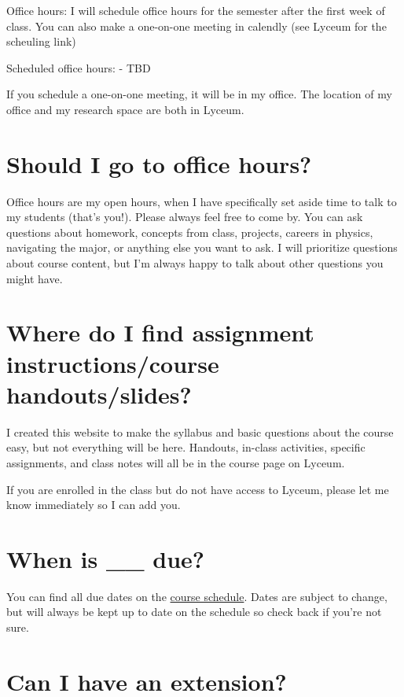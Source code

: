 \documentclass[
  letterpaper,
  DIV=11,
  numbers=noendperiod]{scrartcl}
\begin{document}
Office hours: I will schedule office hours for the semester after the
first week of class. You can also make a one-on-one meeting in calendly
(see Lyceum for the scheuling link)

Scheduled office hours: - TBD

If you schedule a one-on-one meeting, it will be in my office. The
location of my office and my research space are both in Lyceum.

\section{Should I go to office hours?}\label{goingtoofficehours}

Office hours are my open hours, when I have specifically set aside time
to talk to my students (that's you!). Please always feel free to come
by. You can ask questions about homework, concepts from class, projects,
careers in physics, navigating the major, or anything else you want to
ask. I will prioritize questions about course content, but I'm always
happy to talk about other questions you might have.

\section{Where do I find assignment instructions/course
handouts/slides?}\label{findstuff}

I created this website to make the syllabus and basic questions about
the course easy, but not everything will be here. Handouts, in-class
activities, specific assignments, and class notes will all be in the
course page on Lyceum.

If you are enrolled in the class but do not have access to Lyceum,
please let me know immediately so I can add you.

\section{When is \_\_ due?}\label{duedates}

You can find all due dates on the
\href{https://docs.google.com/spreadsheets/d/1Kc-CtZYLF3HwOKw7-evwPCMCf3C1m3t2AZBAinf3KL8/edit?usp=sharing}{course
schedule}. Dates are subject to change, but will always be kept up to
date on the schedule so check back if you're not sure.

\section{Can I have an extension?}\label{extensionpolicy}
\end{document}
